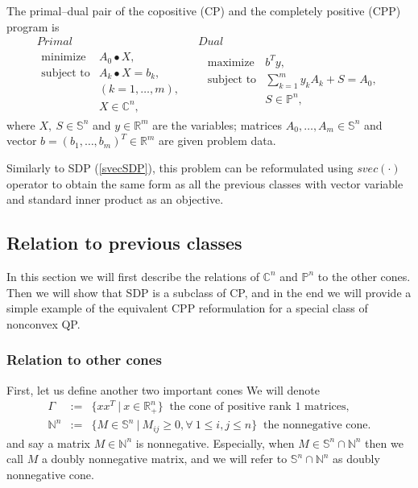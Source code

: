 \documentclass[12pt]{book}
\theoremstyle{definition}
\begin{document}
\label{defCPandCPP}
The primal--dual pair of the copositive (CP) and the completely positive (CPP) program is
\begin{equation}
\label{cp&cpp} 
\begin{array}{cc}
Primal & Dual \\
\begin{array}{ll}
\mbox{minimize} & A_0\bullet X,\\
\mbox{subject to}& A_k\bullet X  = b_k, \ \\
 & ( k = 1,\dots ,m), \\
& X \in \mathbb{C}^n,
\end{array}
\ \  &  \ \
\begin{array}{ll}
\mbox{maximize} & b^Ty, \\
\mbox{subject to}& \sum_{k=1}^m y_kA_k + S  = A_0 ,\\
& S \in \mathbb{P}^n, \\
&
\end{array}
\end{array}
\end{equation}
where $X,\ S\in \mathbb{S}^n$ and $y\in \mathbb{R}^m$ are the variables;  matrices $A_0,\dots ,A_m\in \mathbb{S}^n$ and vector $b=(b_1,\dots ,b_m)^T\in \mathbb{R}^m$ are given problem data.

Similarly to SDP (\ref{svecSDP}), this problem can be reformulated using $svec(\cdot )$ operator to obtain the same form as all the previous classes with vector variable and standard inner product as an objective.
\subsection{Relation to previous classes}
In this section we will first describe the relations of $\mathbb{C}^n $ and $\mathbb{P}^n$ to the other cones. Then we will show that SDP is a subclass of CP, and in the end we will provide a simple example of the equivalent CPP reformulation for a special class of nonconvex QP.

\subsubsection{Relation to other cones}
First, let us define another two important cones
\label{defGammaAndNandDNNcones}
We will denote 
\begin{eqnarray*}
\Gamma &:=& \{ xx^T \ \vert \ x\in\mathbb{R}^n_+ \}  \ \mbox{ the cone of positive rank 1 matrices}, \\
\mathbb{N}^n &:=& \{ M\in \mathbb{S}^n \ \vert \ M_{ij} \geq 0, \forall \ 1\leq i,j\leq n \} \ \mbox{ the nonnegative cone}.
\end{eqnarray*}
and say a matrix $M\in \mathbb{N}^n$ is nonnegative. Especially, when $M \in \mathbb{S}^n \cap \mathbb{N}^n$ then we call $M$ a doubly nonnegative matrix, and we will refer to $\mathbb{S}^n \cap \mathbb{N}^n$ as doubly nonnegative cone.
\end{document}
